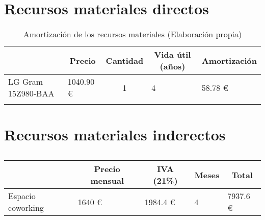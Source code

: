 \section{Recursos materiales directos}
\label{sec:recursos_directos}

\begin{table}[H]
    \centering
    \begin{tabular}{llcll}
    \hline
    \rowcolor[HTML]{8EA9D8} 
    \multicolumn{1}{|c|}{\cellcolor[HTML]{8EA9D8}\textbf{Recursos materiales}} & \multicolumn{1}{c|}{\cellcolor[HTML]{8EA9D8}\textbf{Precio}} & \multicolumn{1}{c|}{\cellcolor[HTML]{8EA9D8}\textbf{Cantidad}} & \multicolumn{1}{c|}{\cellcolor[HTML]{8EA9D8}\textbf{Vida útil (años)}} & \multicolumn{1}{c|}{\cellcolor[HTML]{8EA9D8}\textbf{Amortización}} \\ \hline
    \multicolumn{1}{|l|}{LG Gram 15Z980-BAA}                                   & \multicolumn{1}{l|}{1040.90 €}                               & \multicolumn{1}{c|}{1}                                         & \multicolumn{1}{l|}{4}                                                 & \multicolumn{1}{l|}{58.78 €}                                       \\ \hline
                                                                               &                                                              & \multicolumn{1}{l}{}                                           &                                                                        &                                                                   
    \end{tabular}
    \caption{Amortización de los recursos materiales (Elaboración propia)}
    \label{tab:amortizacion}
\end{table}

\section{Recursos materiales inderectos}
\label{sec:recursos_indirectos}

\begin{table}[H]
    \centering
    \begin{tabular}{l|l|l|l|l|}
    \cline{2-5}
                                            & \multicolumn{1}{c|}{\cellcolor[HTML]{8EA9D8}\textbf{Precio mensual}} & \multicolumn{1}{c|}{\cellcolor[HTML]{8EA9D8}\textbf{IVA (21\%)}} & \multicolumn{1}{c|}{\cellcolor[HTML]{8EA9D8}\textbf{Meses}} & \multicolumn{1}{c|}{\cellcolor[HTML]{8EA9D8}\textbf{Total}} \\ \hline
    \multicolumn{1}{|l|}{Espacio coworking} & 1640 €                                                               & 1984.4 €                                                         & 4                                                           & 7937.6 €                                                    \\ \hline
    \end{tabular}
    \caption{}
    \label{tab:oficina}
\end{table}

